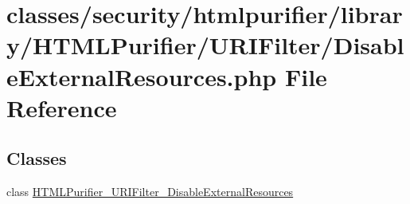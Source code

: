 \hypertarget{DisableExternalResources_8php}{\section{classes/security/htmlpurifier/library/\+H\+T\+M\+L\+Purifier/\+U\+R\+I\+Filter/\+Disable\+External\+Resources.php File Reference}
\label{DisableExternalResources_8php}
}
\subsection*{Classes}
\begin{DoxyCompactItemize}
\item 
class \hyperlink{classHTMLPurifier__URIFilter__DisableExternalResources}{H\+T\+M\+L\+Purifier\+\_\+\+U\+R\+I\+Filter\+\_\+\+Disable\+External\+Resources}
\end{DoxyCompactItemize}
